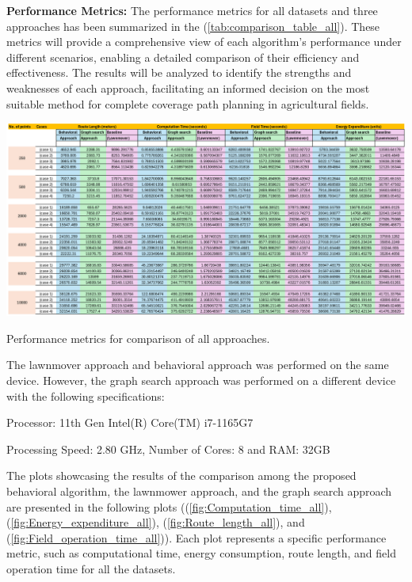 \vspace*{6mm}   

\textbf{Performance Metrics: } The performance metrics for all datasets and three approaches has been summarized in the (\autoref{tab:comparison_table_all}). These metrics will provide a comprehensive view of each algorithm's performance under different scenarios, enabling a detailed comparison of their efficiency and effectiveness. The results will be analyzed to identify the strengths and weaknesses of each approach, facilitating an informed decision on the most suitable method for complete coverage path planning in agricultural fields.


\begin{table}[htbp]
    \centering
    \includegraphics[width=\textwidth]{experimental_data/new_table_image.png}
    \caption{Performance metrics for comparison of all approaches.}
    \label{tab:comparison_table_all}
\end{table}


\vspace*{6mm}

The lawnmover approach and behavioral approach was performed on the same device. However, the graph search approach was performed on a different device with the following specifications:


Processor: 11th Gen Intel(R) Core(TM) i7-1165G7


Processing Speed: 2.80 GHz, Number of Cores: 8 and RAM: 32GB


\vspace*{6mm}


The plots showcasing the results of the comparison among the proposed behavioral algorithm, the lawnmower approach, and the graph search approach are presented in the following plots ((\autoref{fig:Computation_time_all}), (\autoref{fig:Energy_expenditure_all}), (\autoref{fig:Route_length_all}), and (\autoref{fig:Field_operation_time_all})). Each plot represents a specific performance metric, such as computational time, energy consumption, route length, and field operation time for all the datasets. 

